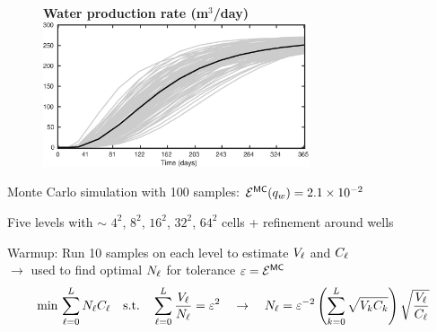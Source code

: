 \begin{frame}{\name{}}
    \begin{figure}
        \centering
        \textbf{Water production rate (m$^3$/day)}
        \includegraphics[width = 0.7\textwidth]{figures/example-2/water-rate.eps}
    \end{figure}
    \begin{squarelist}
        \item Monte Carlo simulation with 100 samples: $\mathcal{E}^{\mathsf{MC}}(q_w) = 2.1\times10^{-2}$
    \end{squarelist}
\end{frame}

\begin{frame}{\name{}}
    \begin{figure}
        \centering
    \end{figure}
    \begin{squarelist}
        \item<1-> Five levels with $\sim$ $4^2$, $8^2$, $16^2$, $32^2$, $64^2$ cells + refinement around wells
        \item<2-> Warmup: Run 10 samples on each level to estimate $V_\ell$ and $C_\ell$ \\
        $\rightarrow$ used to find optimal $N_\ell$ for tolerance $\varepsilon = \mathcal{E}^{{\mathsf{MC}}}$
         \begin{equation*}
            \min\, \sum_{\ell = 0}^L N_\ell C_\ell \quad \text{s.t.} \quad \sum_{\ell = 0}^L\frac{V_\ell}{N_\ell} = \varepsilon^2 \quad \rightarrow \quad N_\ell = \varepsilon^{-2}\left(\sum_{k = 0}^L \sqrt{V_k C_k}\right)\sqrt{\frac{V_\ell}{C_\ell}}
        \end{equation*}
    \end{squarelist}
\end{frame}

